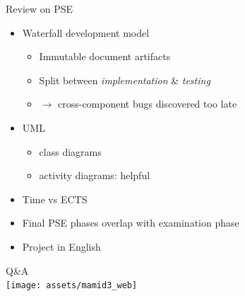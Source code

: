 \documentclass[11pt,aspectratio=169]{beamer}
\newcommand{\xmark}{\ding{55}}%
\newcommand{\checkcomment}[1]{%
    \def\temp{#1}%
    \ifx\temp\empty%
    \emph{}%
    \else%
    \emph{Note: #1}%
    \fi%
}%
\newcommand{\done}[1][]{{\color{darkgreen}\checkmark\checkcomment{#1}}}
\newcommand{\notdone}[1][]{{\color{red}\xmark\checkcomment{#1}}}
\begin{document}
    \newcommand\itembad{\item[\notdone]}
    \newcommand\itemgood{\item[\done]}

    \begin{frame}{Review on PSE}
      \pause
      \begin{itemize}
        \itembad<+-> Waterfall development model
        \begin{itemize}
          \itembad<+-> Immutable document artifacts
          \itembad<+-> Split between \textit{implementation} \& \textit{testing}
          \itembad<+-> $\rightarrow$ cross-component bugs discovered too late
        \end{itemize}
        \itembad<+-> UML
            \begin{itemize}
              \item class diagrams
              \item activity diagrams: helpful
            \end{itemize}
        \itembad<+-> Time vs ECTS
        \itembad<+-> Final PSE phases overlap with examination phase
        \itemgood<+-> Project in English
      \end{itemize}
    \end{frame}

    \begin{frame}{}
       \vfill
        \centering
        \Huge
        Q\&A \\
            \vspace{10pt}
            \hspace*{5pt}\texttt{[image: assets/mamid3\_web]}
        \vfill
    \end{frame}
    
\end{document}
